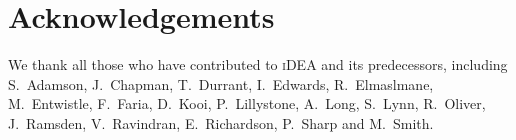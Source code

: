 \documentclass[5p,times,twocolumn]{elsarticle}
\newcommand{\iDEA}{\textsc{iDEA}}
\begin{document}
\section*{Acknowledgements}
We thank all those who have contributed to \iDEA{} and its predecessors, including S.~Adamson, J.~Chapman, T.~Durrant, I.~Edwards, R.~Elmaslmane, M.~Entwistle, F.~Faria, D.~Kooi, P.~Lillystone, A.~Long, S.~Lynn, R.~Oliver, J.~Ramsden, V.~Ravindran, E.~Richardson, P.~Sharp and M.~Smith.



\end{document}
